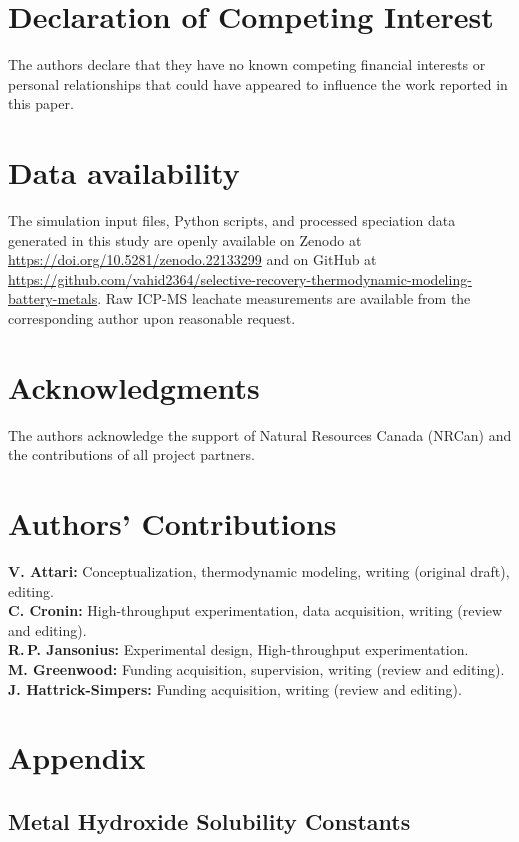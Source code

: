 \documentclass[final,2p,times]{elsarticle}
\begin{document}

\section*{Declaration of Competing Interest}
The authors declare that they have no known competing financial interests or personal relationships that could have appeared to influence the work reported in this paper.

\section*{Data availability}
The simulation input files, Python scripts, and processed speciation data generated in this study are openly available on Zenodo at \url{https://doi.org/10.5281/zenodo.22133299} and on GitHub at \url{https://github.com/vahid2364/selective-recovery-thermodynamic-modeling-battery-metals}. Raw ICP-MS leachate measurements are available from the corresponding author upon reasonable request.

\section*{Acknowledgments}
The authors acknowledge the support of Natural Resources Canada (NRCan) and the contributions of all project partners.

\section*{Authors' Contributions}
\noindent
\textbf{V. Attari:} Conceptualization, thermodynamic modeling, writing (original draft), editing. \\
\textbf{C. Cronin:} High-throughput experimentation, data acquisition, writing (review and editing). \\
\textbf{R.\,P. Jansonius:} Experimental design, High-throughput experimentation. \\
\textbf{M. Greenwood:} Funding acquisition, supervision, writing (review and editing). \\
\textbf{J. Hattrick-Simpers:} Funding acquisition, writing (review and editing).




\section*{Appendix}

\subsection{Metal Hydroxide Solubility Constants}
\end{document}
